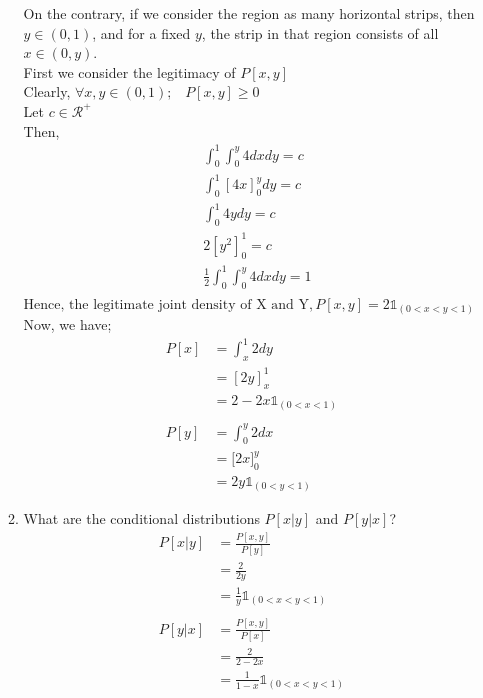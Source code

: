 \documentclass[
  12pt,
]{article}
\begin{document}
\begin{enumerate}
\begin{enumerate}
{On the contrary, if we consider the region as many horizontal strips, then $y \in (0, 1)$, and for a fixed $y$, the strip in that region consists of all $x \in (0, y)$.\\
First we consider the legitimacy of $P[x,y]$\\
Clearly, $\forall x, y \in (0,1); \;\;\; P[x,y] \ge 0$\\
Let $c \in \mathcal{R}^{+}$\\
Then,
$$\begin{aligned}
&\int_{0}^{1} \int_{0}^{y} 4dxdy = c\\
&\int_{0}^{1}[4x]_{0}^{y}dy = c\\
&\int_{0}^{1}4ydy = c\\
&2[y^2]_{0}^{1} = c\\
&\frac{1}{2}\int_{0}^{1} \int_{0}^{y} 4dxdy = 1\\
\end{aligned}$$
$\text{Hence, the legitimate joint density of X and Y}, P[x, y] = 2\mathbb{1}_{(0 <x< y<1)}$\\
Now, we have;
$$\begin{aligned}
P[x] &= \int_{x}^{1}2dy\\
&= [2y]_{x}^{1}\\
&= 2-2x \mathbb{1}_{(0 < x<1)}\\
\\
P[y] &= \int_{0}^{y}2dx\\
&= \Big[2x\Big]_{0}^{y}\\
&= 2y\mathbb{1}_{(0 < y<1)}
\end{aligned}$$
}
\item What are the conditional distributions $P[x|y]$ and $P[y|x]$?
{
\color{blue}
$$\begin{aligned}
P[x|y] &= \frac{P[x,y]}{P[y]}\\
&= \frac{2}{2y}\\
&=\frac{1}{y}\mathbb{1}_{(0 < x <y < 1)}\\
\\
P[y|x] &= \frac{P[x,y]}{P[x]}\\
&= \frac{2}{2-2x}\\
&= \frac{1}{1-x}\mathbb{1}_{(0 < x <y<1)}
\end{aligned}$$
}
\end{enumerate}
\end{enumerate}
\end{document}
